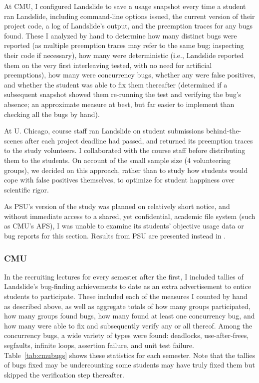 At CMU, I configured Landslide to save a usage snapshot every time a student ran Landslide,
including command-line options issued, the current version of their project code,
a log of Landslide's output,
and the preemption traces for any bugs found.
These I analyzed by hand to determine how many distinct bugs were reported
(as multiple preemption traces may refer to the same bug; inspecting their code if necessary),
how many were deterministic
(i.e., Landslide reported them on the very first interleaving tested, with no need for artificial preemptions),
how many were concurrency bugs,
whether any were false positives,
and whether the student was able to fix them thereafter
(determined if a subsequent snapshot showed them re-running the test and verifying the bug's absence;
an approximate measure at best, but far easier to implement than checking all the bugs by hand).

At U. Chicago,
course staff ran Landslide on student submissions behind-the-scenes
after each project deadline had passed,
and returned its preemption traces to the study volunteers.
I collaborated with the course staff
before distributing them to the students.
On account of the small sample size (4 volunteering groups),
we decided on this approach,
rather than to study how students would cope with false positives themselves,
to optimize for student happiness over scientific rigor.

As PSU's version of the study was planned on relatively short notice,
and without immediate access to a shared, yet confidential, academic file system (such as CMU's AFS),
I was unable to examine its students' objective usage data or bug reports for this section.
Results from PSU are presented instead in \sect{\ref{sec:education-eval-survey}}.

\subsubsection{CMU}
\label{sec:education-eval-bugs-cmu}

In the recruiting lectures for every semester after the first,
I included tallies of Landslide's bug-finding achievements to date
as an extra advertisement to entice students to participate.
These included each of the measures I counted by hand as described above,
as well as aggregate totals of how many groups participated,
how many groups found bugs,
how many found at least one concurrency bug,
and how many were able to fix and subsequently verify any or all thereof.
Among the concurrency bugs, a wide variety of types were found:
deadlocks, use-after-frees, segfaults, infinite loops, assertion failure, and unit test failure.
Table~\ref{tab:cmubugs} shows these statistics for each semester.
Note that the tallies of bugs fixed may be undercounting
 some students may have truly fixed them but skipped the verification step thereafter.

